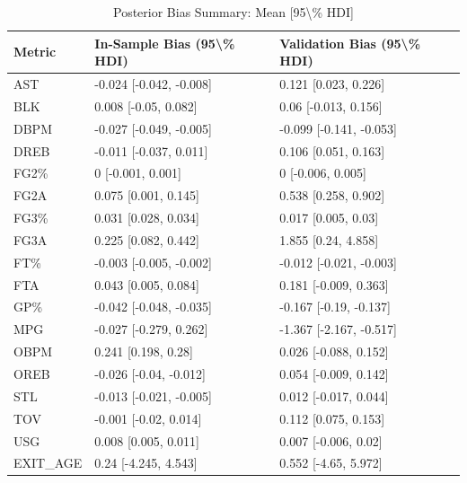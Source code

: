 \begin{table}[t]
\caption*{
{\fontsize{20}{25}\selectfont  Posterior Bias Summary: Mean [95\textbackslash{}\% HDI]\fontsize{12}{15}\selectfont }
} 
\fontsize{12.0pt}{14.0pt}\selectfont
\begin{tabular*}{\linewidth}{@{\extracolsep{\fill}}lll}
\toprule
Metric & In-Sample Bias (95\textbackslash{}\% HDI) & Validation Bias (95\textbackslash{}\% HDI) \\ 
\midrule\addlinespace[2.5pt]
AST & -0.024 [-0.042, -0.008] & 0.121 [0.023, 0.226] \\ 
BLK & 0.008 [-0.05, 0.082] & 0.06 [-0.013, 0.156] \\ 
DBPM & -0.027 [-0.049, -0.005] & -0.099 [-0.141, -0.053] \\ 
DREB & -0.011 [-0.037, 0.011] & 0.106 [0.051, 0.163] \\ 
FG2\% & 0 [-0.001, 0.001] & 0 [-0.006, 0.005] \\ 
FG2A & 0.075 [0.001, 0.145] & 0.538 [0.258, 0.902] \\ 
FG3\% & 0.031 [0.028, 0.034] & 0.017 [0.005, 0.03] \\ 
FG3A & 0.225 [0.082, 0.442] & 1.855 [0.24, 4.858] \\ 
FT\% & -0.003 [-0.005, -0.002] & -0.012 [-0.021, -0.003] \\ 
FTA & 0.043 [0.005, 0.084] & 0.181 [-0.009, 0.363] \\ 
GP\% & -0.042 [-0.048, -0.035] & -0.167 [-0.19, -0.137] \\ 
MPG & -0.027 [-0.279, 0.262] & -1.367 [-2.167, -0.517] \\ 
OBPM & 0.241 [0.198, 0.28] & 0.026 [-0.088, 0.152] \\ 
OREB & -0.026 [-0.04, -0.012] & 0.054 [-0.009, 0.142] \\ 
STL & -0.013 [-0.021, -0.005] & 0.012 [-0.017, 0.044] \\ 
TOV & -0.001 [-0.02, 0.014] & 0.112 [0.075, 0.153] \\ 
USG & 0.008 [0.005, 0.011] & 0.007 [-0.006, 0.02] \\ 
EXIT\_AGE & 0.24 [-4.245, 4.543] & 0.552 [-4.65, 5.972] \\ 
\bottomrule
\end{tabular*}
\end{table}

